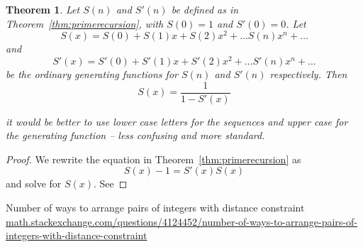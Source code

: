 \documentclass[10pt]{article}
\newtheorem{theorem}{Theorem}
\numberwithin{equation}{section}
\newenvironment{anote}
               {{\textcolor{blue}{Note:}}
                 \itshape
               }
               {}
\begin{document}
\begin{theorem}
Let $S(n)$ and $S'(n)$ be defined as in Theorem~\ref{thm:primerecursion}, with $S(0)=1$ and $S'(0)=0$. Let 
\begin{equation*}
    S(x)=S(0)+S(1)x+S(2)x^2 + \ldots S(n)x^n + \ldots
\end{equation*}
and 
\begin{equation*}
  S'(x)=S'(0)+S'(1)x+S'(2)x^2 + \ldots S'(n)x^n + \ldots  
\end{equation*}
be the ordinary generating functions for $S(n)$ and $S'(n)$ respectively. Then 
\begin{equation*}
    S(x) = \dfrac{1}{1-S'(x)}
\end{equation*}

\begin{anote}
it would be better to use lower case letters for the sequences and upper case for the generating function -- less confusing and more standard. 
\end{anote}
\end{theorem}
\begin{proof}
We rewrite the equation in Theorem~\ref{thm:primerecursion} as 
\begin{equation*}
    S(x)-1=S'(x)S(x)
\end{equation*}
and solve for $S(x)$. See
\end{proof}

\begin{thebibliography}{100}

Number of ways to arrange pairs of integers with distance constraint
\href{https://math.stackexchange.com/questions/4124452/number-of-ways-to-arrange-pairs-of-integers-with-distance-constraint}{math.stackexchange.com/questions/4124452/number-of-ways-to-arrange-pairs-of-integers-with-distance-constraint}

\end{thebibliography}
%
\end{document}
